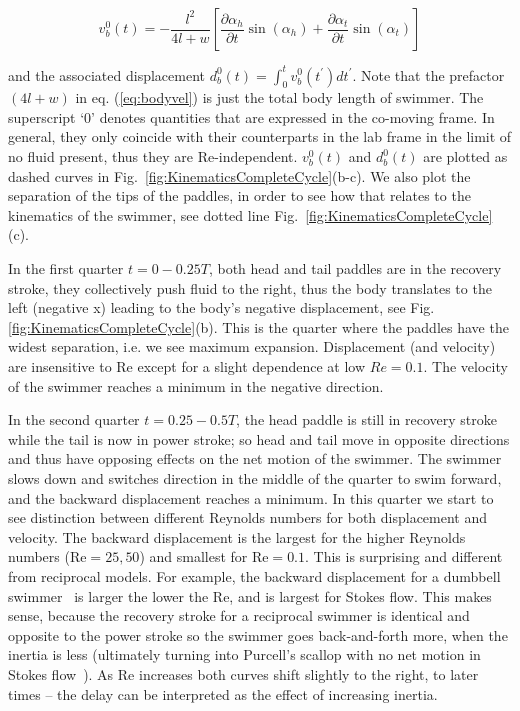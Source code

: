 \documentclass[%
 onecolumn,
superscriptaddress,
 amsmath,amssymb,
 aps,
longbibliography
]{revtex4-2}
\begin{document}
\begin{equation}
v^0_{b}(t) = - \frac{l^2}{4l + w} \left[
\frac{\partial \alpha_h}{\partial{t}} \sin (\alpha_h) +
\frac{\partial \alpha_t}{\partial{t}} \sin (\alpha_t)
\right]
\label{eq:bodyvel}
\end{equation}
 
\noindent and the associated displacement $d^0_{b}(t) = \int_{0}^{t} v^0_{b}(t^{\prime}) d t^{\prime}$. Note that the prefactor $(4 l + w)$ in eq. (\ref{eq:bodyvel}) is just the total body length of swimmer. The superscript `$0$' denotes quantities that are expressed in the co-moving frame.
In general, they only coincide with their counterparts in the lab frame in the limit of no fluid present, thus they are Re-independent. $v^0_{b}(t)$ and $d^0_{b}(t)$ are plotted as dashed curves in Fig.~\ref{fig:KinematicsCompleteCycle}(b-c).
We also plot the separation of the tips of the paddles, in order to see how that relates to the kinematics of the swimmer, see dotted line Fig.~\ref{fig:KinematicsCompleteCycle}(c).

In the first quarter $t = 0 - 0.25 T$, both head and tail paddles are in the recovery stroke, they collectively push fluid to the right, thus the body translates to the left (negative x) leading to the body's negative displacement, see Fig.\ref{fig:KinematicsCompleteCycle}(b). This is the quarter where the paddles have the widest separation, i.e. we see maximum expansion. Displacement (and velocity) are insensitive to Re except for a slight dependence at low $Re = 0.1$. The velocity of the swimmer reaches a minimum in the negative direction.

In the second quarter $t = 0.25 - 0.5 T$, the head paddle is still in recovery stroke while the tail is now in power stroke; so head and tail move in opposite directions and thus have opposing effects on the net motion of the swimmer. The swimmer slows down and switches direction in the middle of the quarter to swim forward, and the backward displacement reaches a minimum. In this quarter we start to see distinction between different Reynolds numbers for both displacement and velocity. The backward displacement is the largest for the higher Reynolds numbers (Re$=25, 50$) and smallest for Re$=0.1$. This is surprising and different from reciprocal models. For example, the backward displacement for a dumbbell swimmer~\cite{Dombrowski2019Transition,Dombrowski2020Kinematics} is larger the lower the Re, and is largest for Stokes flow. This makes sense, because the recovery stroke for a reciprocal swimmer is identical and opposite to the power stroke so the swimmer goes back-and-forth more, when the inertia is less (ultimately turning into Purcell's scallop with no net motion in Stokes flow~\cite{Purcell1977}). As Re increases both curves shift slightly to the right, to later times -- the delay can be interpreted as the effect of increasing inertia. 
\end{document}
